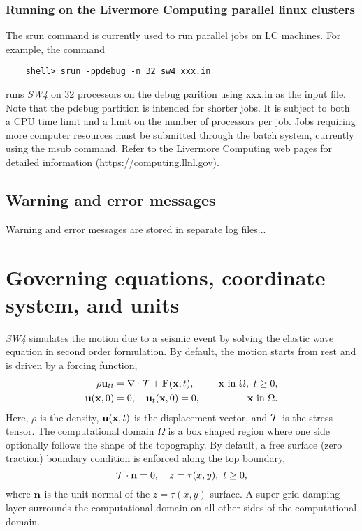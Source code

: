 \documentclass[11pt]{report}
\newcommand{\nb}{{\bf n}}
\begin{document}
\subsection{Running on the Livermore Computing parallel linux clusters}
%
The srun command is currently used to run parallel jobs on LC machines. For example, the command
\begin{verbatim}
	shell> srun -ppdebug -n 32 sw4 xxx.in
\end{verbatim}
runs \emph{SW4} on 32 processors on the debug parition using xxx.in as the input file. Note that the
pdebug partition is intended for shorter jobs. It is subject to both a CPU time limit and a limit on
the number of processors per job. Jobs requiring more computer resources must be submitted through
the batch system, currently using the msub command. Refer to the Livermore Computing web pages for
detailed information (https://computing.llnl.gov).

\section{Warning and error messages}

Warning and error messages are stored in separate log files...

\chapter{Governing equations, coordinate system, and units}
%
\emph{SW4} simulates the motion due to a seismic event by solving the elastic 
wave equation in second order formulation. By default, the motion starts from rest and is driven by
a forcing function,
\begin{alignat}{3}
\rho {\bf u}_{tt} &= \nabla\cdot{\cal T} + {\bf F}({\bf x},t),&\quad\mbox{${\bf x}$ in
  $\Omega$},\ t\geq 0,\label{eq:elastic-we}\\ 
{\bf u}({\bf x},0)&=0,\quad {\bf u}_t({\bf x},0) = 0, &\quad\mbox{${\bf x}$ in $\Omega$}.
\end{alignat}
Here, $\rho$ is the density, ${\bf u}({\bf x},t)$ is the displacement vector, and ${\cal T}$ is the
stress tensor. The computational domain $\Omega$ is a box shaped region where one side optionally
follows the shape of the topography. By default, a free surface (zero traction) boundary condition
is enforced along the top boundary,
\[
{\cal T} \cdot \nb = 0,\quad z=\tau(x,y),\ t\geq 0,
\]
where $\nb$ is the unit normal of the $z=\tau(x,y)$ surface. A super-grid damping layer surrounds
the computational domain on all other sides of the computational domain.
\end{document}
